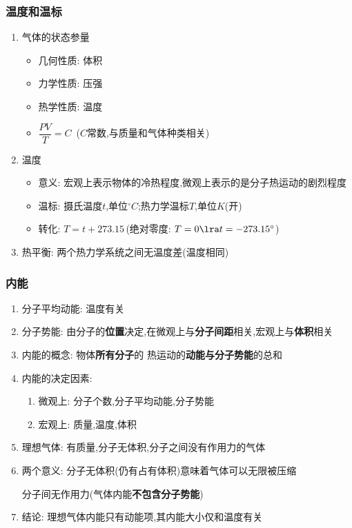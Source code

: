 \documentclass{article}
\begin{document}
\subsubsection{温度和温标}
\begin{enumerate}
    \item 气体的状态参量
          \begin{itemize}
              \item 几何性质: 体积
              \item 力学性质: 压强
              \item 热学性质: 温度
              \item $\dfrac{PV}{T} = C \,$ ($C$常数,与质量和气体种类相关)
          \end{itemize}
    \item 温度
          \begin{itemize}
              \item 意义: 宏观上表示物体的冷热程度,微观上表示的是分子热运动的剧烈程度
              \item 温标: 摄氏温度$t$,单位$^{\circ} C$;热力学温标$T$,单位$K$(开)
              \item 转化: $T = t + 273.15 \,$(绝对零度: $T = 0 \lra t = -273.15^{\circ} $)
          \end{itemize}
    \item 热平衡: 两个热力学系统之间无温度差(温度相同)
\end{enumerate}

\vspace{2em}

\subsubsection{内能}
\begin{enumerate}
    \item 分子平均动能: 温度有关
    \item 分子势能: 由分子的\textbf{位置}决定,在微观上与\textbf{分子间距}相关,宏观上与\textbf{体积}相关
    \item 内能的概念: 物体\textbf{所有分子}的 热运动的\textbf{动能与分子势能}的总和
    \item 内能的决定因素:
          \begin{enumerate}[label = (\arabic*)]
              \item 微观上: 分子个数,分子平均动能,分子势能
              \item 宏观上: 质量,温度,体积
          \end{enumerate}
    \item 理想气体: 有质量,分子无体积,分子之间没有作用力的气体
    \item 两个意义: 分子无体积(仍有占有体积)意味着气体可以无限被压缩

          \hspace{4.7em}分子间无作用力(气体内能\textbf{不包含分子势能})
    \item 结论: 理想气体内能只有动能项,其内能大小仅和温度有关
\end{enumerate}
\end{document}

